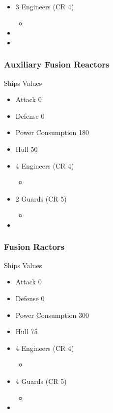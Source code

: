 \documentclass[11pt]{article}
\begin{document}
{\begin{itemize}
\item 3 Engineers (CR 4)
\begin{itemize}
\item {}
\end{itemize}
\item {}
\item {}
\end{itemize}
\subsubsection{Auxiliary Fusion Reactors}
\label{sec:orgca64e18}
Ships Values
\begin{itemize}
\item Attack 0
\item Defense 0
\item Power Consumption 180
\item Hull 50

\item 4 Engineers (CR 4)
\begin{itemize}
\item {}
\end{itemize}
\item 2 Guards (CR 5)
\begin{itemize}
\item {}
\end{itemize}
\item {}
\end{itemize}
\subsubsection{Fusion Ractors}
\label{sec:orgca368ca}
Ships Values
\begin{itemize}
\item Attack 0
\item Defense 0
\item Power Consumption 300
\item Hull 75

\item 4 Engineers (CR 4)
\begin{itemize}
\item {}
\end{itemize}
\item 4 Guards (CR 5)
\begin{itemize}
\item {}
\end{itemize}
\item {}
\end{itemize}
}
\end{document}
